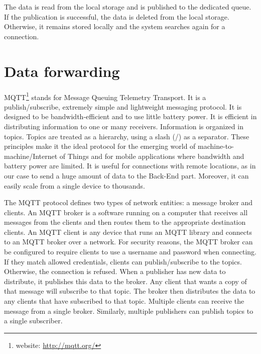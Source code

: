 
The data is read from the local storage and is published to the dedicated queue. If the publication is successful, the data is deleted from the local storage. Otherwise, it remains stored locally and the system searches again for a connection.


\section{Data forwarding}
\label{sec:forwarding}
\vspace{0.2 cm} 

MQTT\footnote{ website: \url{http://mqtt.org/} } stands for Message Queuing Telemetry Transport. It is a publish/subscribe, extremely simple and lightweight messaging protocol. It is designed to be bandwidth-efficient and to use little battery power. It is efficient in distributing information to one or many receivers. Information is organized in topics. Topics are treated as a hierarchy, using a slash (/) as a separator. These principles make it the ideal protocol for the emerging world of machine-to-machine/Internet of Things and for mobile applications where bandwidth and battery power are limited. It is useful for connections with remote locations, as in our case to send a huge amount of data to the Back-End part. Moreover, it can easily scale from a single device to thousands.

The MQTT protocol defines two types of network entities: a message broker and clients. An MQTT broker is a software running on a computer that receives all messages from the clients and then routes them to the appropriate destination clients. An MQTT client is any device that runs an MQTT library and connects to an MQTT broker over a network.
For security reasons, the MQTT broker can be configured to require clients to use a username and password when connecting. If they match allowed credentials, clients can publish/subscribe to the topics. Otherwise, the connection is refused.
When a publisher has new data to distribute, it publishes this data to the broker. Any client that wants a copy of that message will subscribe to that topic. The broker then distributes the data to any clients that have subscribed to that topic. Multiple clients can receive the message from a single broker. Similarly, multiple publishers can publish topics to a single subscriber.

